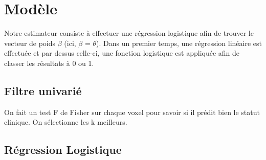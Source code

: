 \section{Modèle}

Notre estimateur consiste à effectuer une régression logistique afin de trouver le vecteur de poids $\beta$ (ici, $\beta$ = $\theta$).
Dans un premier temps, une régression linéaire est effectuée et par dessus celle-ci, une fonction logistique est appliquée afin de classer les résultats à 0 ou 1. 

\subsection{Filtre univarié}

On fait un test F de Fisher sur chaque voxel pour savoir si il prédit bien le statut clinique.
On sélectionne les k meilleurs.

\subsection{Régression Logistique}

% 
%  
% 
% 
% 




